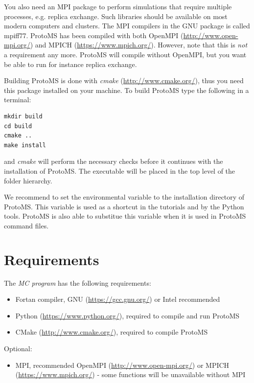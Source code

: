 \documentclass[letterpaper,10pt,english]{manual}
\begin{document}
You also need an MPI package to perform simulations that require multiple processes, e.g. replica exchange. Such libraries should be available on most modern computers and clusters. The MPI compilers in the GNU package is called mpiff77. ProtoMS has been compiled with both OpenMPI (\href{http://www.open-mpi.org/}{http://www.open-mpi.org/}) and MPICH (\href{https://www.mpich.org/}{https://www.mpich.org/}). However, note that this is \emph{not} a requirement any more. ProtoMS will compile without OpenMPI, but you want be able to run for instance replica exchange.

Building ProtoMS is done with \emph{cmake} (\href{http://www.cmake.org/}{http://www.cmake.org/}), thus you need this package installed on your machine. To build ProtoMS type the following in a terminal:

\begin{Verbatim}[commandchars=@\[\]]
mkdir build
cd build
cmake ..
make install
\end{Verbatim}

and \emph{cmake} will perform the necessary checks before it continues with the installation of ProtoMS. The executable will be placed in the top level of the folder hierarchy.

We recommend to set the environmental variable  to the installation directory of ProtoMS. This variable is used as a shortcut in the tutorials and by the Python tools. ProtoMS is also able to substitue this variable when it is used in ProtoMS command files.


\section{Requirements}

The \emph{MC program} has the following requirements:
\begin{itemize}
\item {} 
Fortan compiler, GNU (\href{https://gcc.gnu.org/}{https://gcc.gnu.org/}) or Intel recommended

\item {} 
Python (\href{https://www.python.org/}{https://www.python.org/}), required to compile and run ProtoMS

\item {} 
CMake (\href{http://www.cmake.org/}{http://www.cmake.org/}), required to compile ProtoMS

\end{itemize}

Optional:
\begin{itemize}
\item {} 
MPI, recommended OpenMPI (\href{http://www.open-mpi.org/}{http://www.open-mpi.org/})  or MPICH (\href{https://www.mpich.org/}{https://www.mpich.org/}) - some functions will be unavailable without MPI

\end{itemize}
\end{document}
